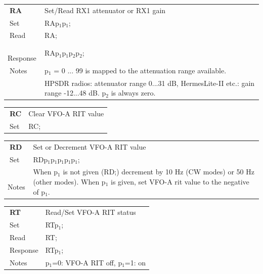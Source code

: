 \documentclass[12pt]{book}
\begin{document}
\begin{center}
\begin{tabular}{|p{2cm}|p{11cm}|}
\toprule
$\phantom{\Big|}$\textbf{\large RA} & Set/Read RX1 attenuator or RX1 gain \\\cline{1-2}
$\phantom{\Big|}${\large Set} & {RAp$_1$p$_1$;} \\\hline
$\phantom{\Big|}${\large Read} & {RA;} \\\hline
$\phantom{\Big|}${\large Response} & {RAp$_1$p$_1$p$_2$p$_2$;} \\\hline
$\phantom{\Big|}${\large Notes} & \multicolumn{1}{|p{11cm}|}{p$_1$ = 0 ... 99 is mapped to the attenuation range available.} \\
 & \multicolumn{1}{|p{11cm}|}{HPSDR radios: attenuator range 0...31 dB, HermesLite-II etc.: gain range -12...48 dB. p$_2$ is always zero.} \\
\bottomrule
\end{tabular}
\end{center}

\begin{center}
\begin{tabular}{|p{2cm}|p{11cm}|}
\toprule
$\phantom{\Big|}$\textbf{\large RC} & Clear VFO-A RIT value \\\cline{1-2}
$\phantom{\Big|}${\large Set} & {RC;} \\\hline
\bottomrule
\end{tabular}
\end{center}

\begin{center}
\begin{tabular}{|p{2cm}|p{11cm}|}
\toprule
$\phantom{\Big|}$\textbf{\large RD} & Set or Decrement VFO-A RIT value \\\cline{1-2}
$\phantom{\Big|}${\large Set} & {RDp$_1$p$_1$p$_1$p$_1$p$_1$;} \\\hline
$\phantom{\Big|}${\large Notes} & \multicolumn{1}{|p{11cm}|}{When p$_1$ is not given (RD;)  decrement by 10 Hz (CW modes) or 50 Hz (other modes). When p$_1$ is given, set VFO-A rit value to the negative of p$_1$.} \\
\bottomrule
\end{tabular}
\end{center}

\begin{center}
\begin{tabular}{|p{2cm}|p{11cm}|}
\toprule
$\phantom{\Big|}$\textbf{\large RT} & Read/Set VFO-A RIT status \\\cline{1-2}
$\phantom{\Big|}${\large Set} & {RTp$_1$;} \\\hline
$\phantom{\Big|}${\large Read} & {RT;} \\\hline
$\phantom{\Big|}${\large Response} & {RTp$_1$;} \\\hline
$\phantom{\Big|}${\large Notes} & \multicolumn{1}{|p{11cm}|}{p$_1$=0: VFO-A RIT off, p$_1$=1: on} \\
\bottomrule
\end{tabular}
\end{center}
\end{document}
